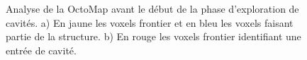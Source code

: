 \begin{figure}[!h]
  \centering
  \hfil
  \caption{
    Analyse de la OctoMap avant le début de la phase d'exploration de cavités.
    a) En jaune les voxels frontier et en bleu les voxels faisant partie de la structure.
    b) En rouge les voxels frontier identifiant une entrée de cavité.
  }
  \label{fig:ugv_frontier}
\end{figure}

